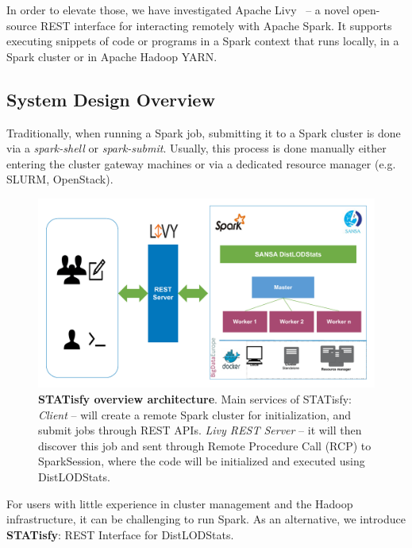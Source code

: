 In order to elevate those, we have investigated Apache Livy~ -- a novel open-source REST interface for interacting remotely with Apache Spark. It supports executing snippets of code or programs in a Spark context that runs locally, in a Spark cluster or in Apache Hadoop YARN.

\subsection{System Design Overview}
Traditionally, when running a Spark job, submitting it to a Spark cluster is done via a \textit{spark-shell} or \textit{spark-submit}.
Usually, this process is done manually either entering the cluster gateway machines or via a dedicated resource manager (e.g. SLURM, OpenStack). 

\begin{figure}
\centering
\includegraphics[width=1.0\columnwidth]{images/4_distlodstats/distlodstats-statisfy.pdf}
\caption{\textbf{STATisfy overview architecture}.
Main services of STATisfy: \textit{Client} -- will create a remote Spark cluster for initialization, and submit jobs through REST APIs.
\textit{Livy REST Server} -- it will then discover this job and sent through Remote Procedure Call (RCP) to SparkSession, where the code will be initialized and executed using DistLODStats.
}
\label{fig:STATisfy}
\end{figure}

For users with little experience in cluster management and the Hadoop infrastructure, it can be challenging to run Spark.
As an alternative, we introduce \textbf{STATisfy}: REST Interface for DistLODStats. 

